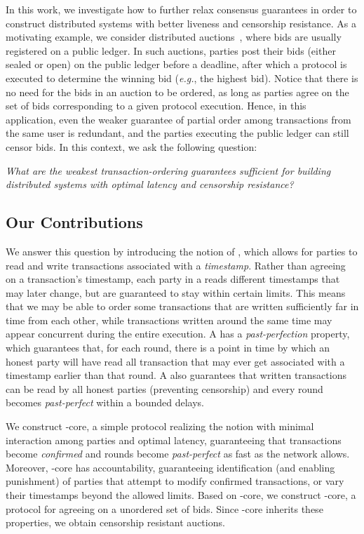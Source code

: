 In this work, we investigate how to further relax consensus guarantees in order to construct distributed systems with better liveness and censorship resistance. As a motivating example, we consider distributed auctions~\cite{trustee,seal,ACNS:DavGenPou22,CCS:TAFWBM23,chitra_et_al:LIPIcs.AFT.2024.19,cryptoeprint:2024/1011}, where bids are usually registered on a public ledger.  In such auctions, parties post their bids (either sealed or open) on the public ledger before a deadline, after which a protocol is executed to determine the winning bid (\textit{e.g.}, the highest bid). Notice that there is no need for the bids in an auction to be ordered, as long as parties agree on the set of bids corresponding to a given protocol execution. Hence, in this application, even the weaker guarantee of partial order among transactions from the same user is redundant, and the parties executing the public ledger can still censor bids. In this context, we ask the following question:

\begin{center}
	\emph{What are the weakest transaction-ordering guarantees sufficient for building distributed systems with optimal latency and censorship resistance?}
\end{center}

\subsection{Our Contributions}
We answer this question by introducing the notion of \podtm, which allows for parties to read and write transactions associated with a \emph{timestamp}. Rather than agreeing on a transaction's timestamp, each party in a \podtm reads different timestamps that may later change, but are guaranteed to stay within certain limits.  This means that we may be able to order some transactions that are written sufficiently far in time from each other, while transactions written around the same time may appear concurrent during the entire execution. A \podtm has a \emph{past-perfection} property, which guarantees that, for each round, there is a point in time by which an honest party will have read all transaction that may ever get associated with a timestamp earlier than that round. A \podtm also guarantees that written transactions can be read by all honest parties (preventing censorship) and every round becomes \emph{past-perfect} within a bounded delays.

We construct \podtm-core, a simple protocol realizing the \podtm notion with minimal interaction among parties and optimal latency, guaranteeing that transactions become \emph{confirmed} and rounds become \emph{past-perfect} as fast as the network allows. Moreover, \podtm-core has accountability, guaranteeing identification (and enabling punishment) of parties that attempt to modify confirmed transactions, or vary their timestamps beyond the allowed limits. Based on \podtm-core, we construct \bidsettm-core, a protocol for agreeing on a unordered set of bids. Since \bidsettm-core inherits these properties, we obtain censorship resistant auctions.
\fi

